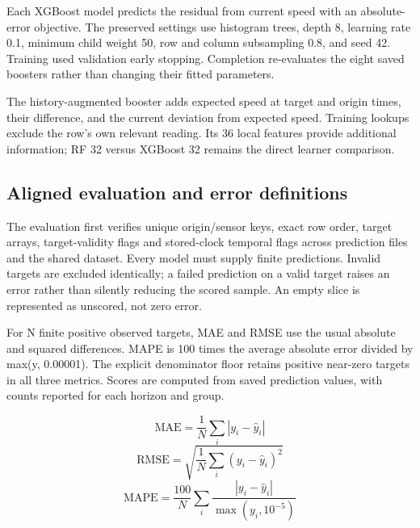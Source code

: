 \documentclass[conference]{IEEEtran}
\begin{document}
Each XGBoost model predicts the residual from current speed with an absolute-error objective. The preserved settings use histogram trees, depth 8, learning rate 0.1, minimum child weight 50, row and column subsampling 0.8, and seed 42. Training used validation early stopping. Completion re-evaluates the eight saved boosters rather than changing their fitted parameters.

The history-augmented booster adds expected speed at target and origin times, their difference, and the current deviation from expected speed. Training lookups exclude the row's own relevant reading. Its 36 local features provide additional information; RF 32 versus XGBoost 32 remains the direct learner comparison.

\subsection{Aligned evaluation and error definitions}
The evaluation first verifies unique origin/sensor keys, exact row order, target arrays, target-validity flags and stored-clock temporal flags across prediction files and the shared dataset. Every model must supply finite predictions. Invalid targets are excluded identically; a failed prediction on a valid target raises an error rather than silently reducing the scored sample. An empty slice is represented as unscored, not zero error.

For N finite positive observed targets, MAE and RMSE use the usual absolute and squared differences. MAPE is 100 times the average absolute error divided by max(y, 0.00001). The explicit denominator floor retains positive near-zero targets in all three metrics. Scores are computed from saved prediction values, with counts reported for each horizon and group.

\begin{equation}\mathrm{MAE}=\frac{1}{N}\sum_i |y_i-\hat y_i|\end{equation}
\begin{equation}\mathrm{RMSE}=\sqrt{\frac{1}{N}\sum_i (y_i-\hat y_i)^2}\end{equation}
\begin{equation}\mathrm{MAPE}=\frac{100}{N}\sum_i\frac{|y_i-\hat y_i|}{\max(y_i,10^{-5})}\end{equation}
\end{document}
